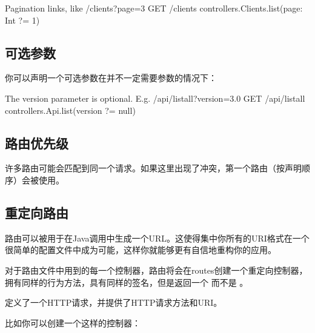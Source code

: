 \documentclass[letterpaper,10pt,english]{sphinxmanual}
\begin{document}
\begin{sphinxVerbatim}[commandchars=\\\{\}]
\PYGZsh{} Pagination links, like /clients?page=3
GET   /clients              controllers.Clients.list(page: Int ?= 1)
\end{sphinxVerbatim}


\subsection{可选参数}
\label{\detokenize{index:id28}}
你可以声明一个可选参数在并不一定需要参数的情况下：

\begin{sphinxVerbatim}[commandchars=\\\{\}]
\PYGZsh{} The version parameter is optional. E.g. /api/list\PYGZhy{}all?version=3.0
GET   /api/list\PYGZhy{}all         controllers.Api.list(version ?= null)
\end{sphinxVerbatim}


\subsection{路由优先级}
\label{\detokenize{index:id29}}
许多路由可能会匹配到同一个请求。如果这里出现了冲突，第一个路由（按声明顺序）会被使用。


\subsection{重定向路由}
\label{\detokenize{index:id30}}
路由可以被用于在Java调用中生成一个URL。这使得集中你所有的URI格式在一个很简单的配置文件中成为可能，这样你就能够更有自信地重构你的应用。

对于路由文件中用到的每一个控制器，路由将会在routes创建一个重定向控制器，拥有同样的行为方法，具有同样的签名，但是返回一个  而不是  。

 定义了一个HTTP请求，并提供了HTTP请求方法和URI。

比如你可以创建一个这样的控制器：

\begin{sphinxVerbatim}[commandchars=\\\{\}]
 
 
 
     
        
             
\end{sphinxVerbatim}
\end{document}
